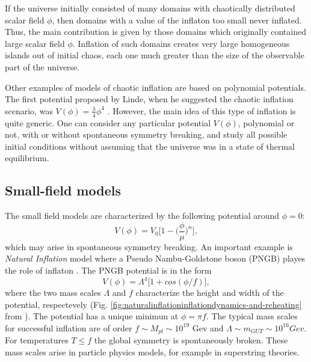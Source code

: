 \documentclass[11pt,a4paper,twoside]{book}
\begin{document}
 If the universe initially consisted of many domains with chaotically distributed scalar field $\phi$, then domains with a value of the inflaton too small never inflated. Thus, the main contribution is given by those domains which originally contained large scalar field $\phi$. Inflation of such domains creates very large homogeneous islands out of initial chaos, each one much greater than the size of the observable part of the universe.
 
 Other examples of models of chaotic inflation are based on polynomial potentials. The first potential proposed by Linde, when he suggested the chaotic inflation scenario, was $ V(\phi) = \frac{\lambda}{4} \phi^{4} $ \cite{ChaoticInflationLinde:Chap2}. However, the main idea of this type of inflation is quite generic. One can consider any particular potential $ V(\phi) $, polynomial or not, with or without spontaneous symmetry breaking, and study all possible initial conditions without assuming that the universe was in a state of thermal equilibrium. 
 
 \subsection{Small-field models}
 The small field models are characterized by the following potential around $\phi=0$:
 \begin{equation}
 	\label{Chap2:small-field1}
 	V(\phi) = V_{0}\Big [1-\Big (\frac{\phi}{\mu}\Big)^{n} \Big],
 \end{equation}
which may arise in spontaneous symmetry breaking.
An important example is \textit{Natural Inflation} model where a Pseudo Nambu-Goldstone boson (PNGB) playes the role of inflaton \cite{Chap2:NaturalInflation}. The PNGB potential is in  the form
\begin{equation}
	\label{Chap2:PNGBPotential}
	V(\phi) = \Lambda^{4}\big [1 + cos(\phi/f) \big],
\end{equation}  
 where the two mass scales $\Lambda$ and $ f $ characterize the height and width of the potential, respectevely (Fig. \ref{fig:naturalinflationinflationdynamics-and-reheating} from \cite{InflationDynamicsAndReheating:chap1}). The potential has a unique minimun at $ \phi = \pi f $. The typical mass scales for successful inflation are of order  $ f \sim M_{pl} \sim 10^{19} $ Gev and $ \Lambda \sim m_{GUT} \sim 10^{16} Gev $. For temperatures $ T \le f $ the global symmetry is spontaneously broken. These mass scales arise in particle physics models, for example in superstring theories. 
 
\end{document}
